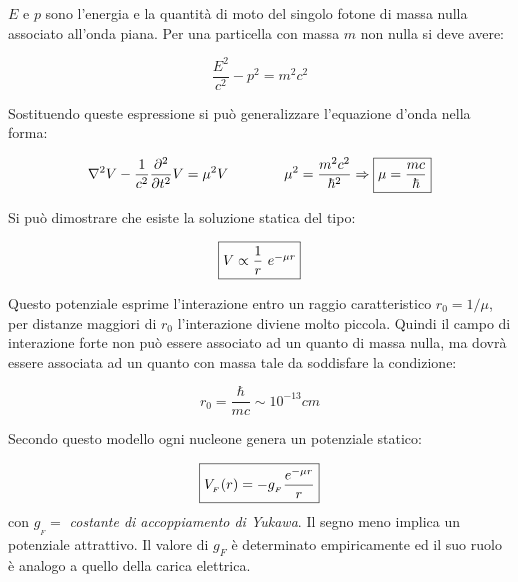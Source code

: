 $E$ e $p$ sono l'energia e la quantità di moto del singolo fotone di massa 
nulla
associato all'onda piana. Per una particella con massa $m$ non nulla si deve
avere:

\begin{equation*}
\dfrac{E^2}{c^2} - p^2 = m^2 c^2
\end{equation*}

Sostituendo queste espressione si può generalizzare l'equazione d'onda nella 
forma:

\begin{equation*}
\nabla^2 V - \dfrac{1}{c^2} \dfrac{\partial^2}{\partial t^2} V = \mu^2 V \qquad 
\qquad
\mu^2 = \dfrac{m^2 c^2}{\hbar^2} \Rightarrow \fbox{$\mu=\dfrac{mc}{\hbar}$}
\end{equation*}

Si può dimostrare che esiste la soluzione statica del tipo:

\begin{equation*}
\fbox{$V \propto \dfrac{1}{r} \ e^{-\mu r}$}
\end{equation*}

Questo potenziale esprime l'interazione entro un raggio caratteristico
$r_0=1/\mu$, per distanze maggiori di $r_0$ l'interazione diviene molto piccola.
Quindi il campo di interazione forte non può essere associato ad un quanto di
massa nulla, ma dovrà essere associata ad un quanto con massa tale da 
soddisfare
la condizione:

\begin{equation*}
r_0=\dfrac{\hbar}{mc} \sim 10^{-13} cm 
\end{equation*}

Secondo questo modello ogni nucleone genera un potenziale statico:

\begin{equation*}
\fbox{$V_{_F}(r) = - g_{_F} \dfrac{e^{-\mu r}}{r}$}
\end{equation*}
con $g_{_F} =$ \textit{costante
di accoppiamento di Yukawa}. Il segno meno implica un potenziale attrattivo. Il
valore di $g_F$ è determinato empiricamente ed il suo ruolo è analogo a quello
della carica elettrica.


